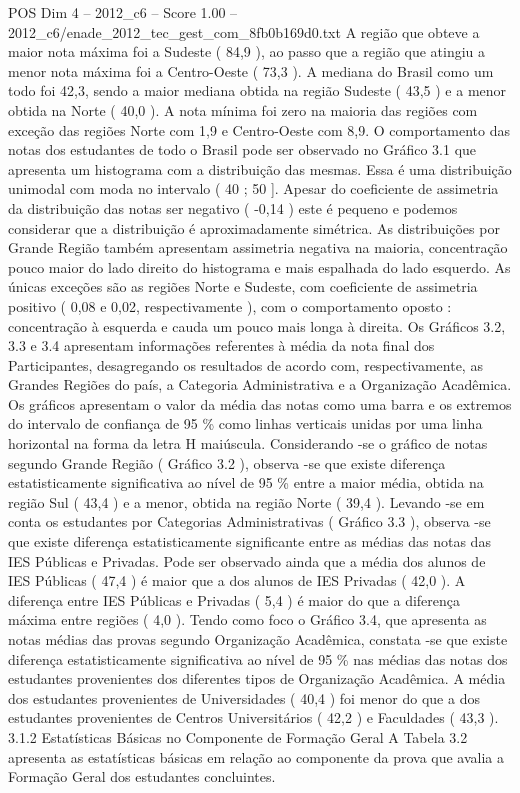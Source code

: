 \begin{textsample}{POS Dim 4 – 2012\_c6 – Score 1.00 – 2012\_c6/enade\_2012\_tec\_gest\_com\_8fb0b169d0.txt}
A região que obteve a maior nota máxima foi a Sudeste ( 84,9 ), ao passo que a região que atingiu a menor nota máxima foi a Centro-Oeste ( 73,3 ).
A mediana do Brasil como um todo foi 42,3, sendo a maior mediana obtida na região Sudeste ( 43,5 ) e a menor obtida na Norte ( 40,0 ).
A nota mínima foi zero na maioria das regiões com exceção das regiões Norte com 1,9 e Centro-Oeste com 8,9.
O comportamento das notas dos estudantes de todo o Brasil pode ser observado no Gráfico 3.1 que apresenta um histograma com a distribuição das mesmas.
Essa é uma distribuição unimodal com moda no intervalo ( 40 ; 50 ].
Apesar do coeficiente de assimetria da distribuição das notas ser negativo ( -0,14 ) este é pequeno e podemos considerar que a distribuição é aproximadamente simétrica.
As distribuições por Grande Região também apresentam assimetria negativa na maioria, concentração pouco maior do lado direito do histograma e mais espalhada do lado esquerdo.
As únicas exceções são as regiões Norte e Sudeste, com coeficiente de assimetria positivo ( 0,08 e 0,02, respectivamente ), com o comportamento oposto : concentração à esquerda e cauda um pouco mais longa à direita.
Os Gráficos 3.2, 3.3 e 3.4 apresentam informações referentes à média da nota final dos Participantes, desagregando os resultados de acordo com, respectivamente, as Grandes Regiões do país, a Categoria Administrativa e a Organização Acadêmica.
Os gráficos apresentam o valor da média das notas como uma barra e os extremos do intervalo de confiança de 95 \% como linhas verticais unidas por uma linha horizontal na forma da letra H maiúscula.
Considerando -se o gráfico de notas segundo Grande Região ( Gráfico 3.2 ), observa -se que existe diferença estatisticamente significativa ao nível de 95 \% entre a maior média, obtida na região Sul ( 43,4 ) e a menor, obtida na região Norte ( 39,4 ).
Levando -se em conta os estudantes por Categorias Administrativas ( Gráfico 3.3 ), observa -se que existe diferença estatisticamente significante entre as médias das notas das IES Públicas e Privadas.
Pode ser observado ainda que a média dos alunos de IES Públicas ( 47,4 ) é maior que a dos alunos de IES Privadas ( 42,0 ).
A diferença entre IES Públicas e Privadas ( 5,4 ) é maior do que a diferença máxima entre regiões ( 4,0 ).
Tendo como foco o Gráfico 3.4, que apresenta as notas médias das provas segundo Organização Acadêmica, constata -se que existe diferença estatisticamente significativa ao nível de 95 \% nas médias das notas dos estudantes provenientes dos diferentes tipos de Organização Acadêmica.
A média dos estudantes provenientes de Universidades ( 40,4 ) foi menor do que a dos estudantes provenientes de Centros Universitários ( 42,2 ) e Faculdades ( 43,3 ). 3.1.2 Estatísticas Básicas no Componente de Formação Geral A Tabela 3.2 apresenta as estatísticas básicas em relação ao componente da prova que avalia a Formação Geral dos estudantes concluintes.

\end{textsample}
